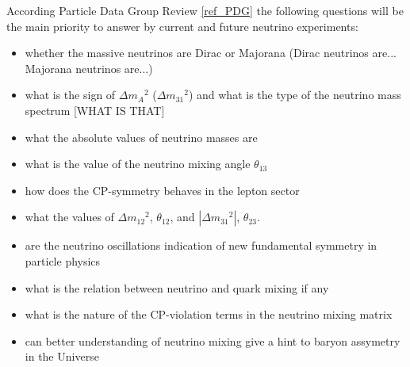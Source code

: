 According Particle Data Group Review \ref{ref_PDG} the following questions will be the main priority to answer by current and future neutrino experiments:
\begin{itemize}
  \item whether the massive neutrinos are Dirac or Majorana (Dirac neutrinos are... Majorana neutrinos are...)
  \item what is the sign of $\Delta{m_A}^2$ ($\Delta{m_31}^2$) and what is the type of the neutrino mass spectrum [WHAT IS THAT]
  \item what the absolute values of neutrino masses are
  \item what is the value of the neutrino mixing angle $\theta_{13}$
  \item how does the CP-symmetry behaves in the lepton sector
  \item what the values of $\Delta{m_{12}}^2$, $\theta_{12}$, and $|\Delta{m_{31}}^2|$, $\theta_{23}$.
  \item are the neutrino oscillations indication of new fundamental symmetry in particle physics
  \item what is the relation between neutrino and quark mixing if any
  \item what is the nature of the CP-violation terms in the neutrino mixing matrix
  \item can better understanding of neutrino mixing give a hint to baryon assymetry in the Universe 
\end{itemize}  

